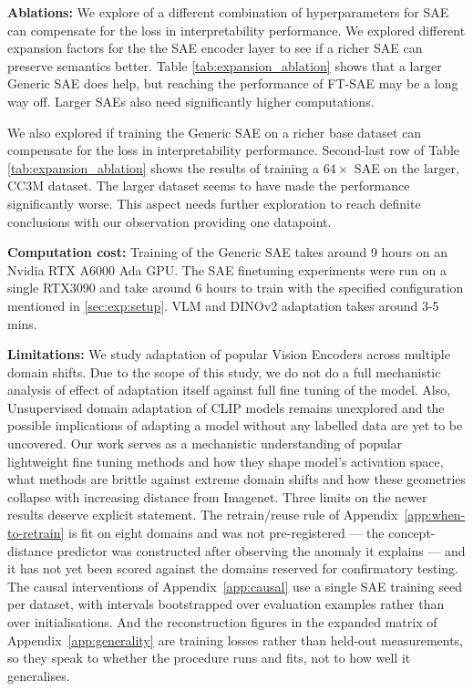 {\bf Ablations:}
We explore of a different combination of hyperparameters for SAE can compensate for the loss in interpretability performance. We explored different expansion factors for the the SAE encoder layer to see if a richer SAE can preserve semantics better. Table \ref{tab:expansion_ablation} shows that a larger Generic SAE does help, but reaching the performance of FT-SAE may be a long way off. Larger SAEs also need significantly higher computations.

We also explored if training the Generic SAE on a richer base dataset can compensate for the loss in interpretability performance. Second-last row of Table \ref{tab:expansion_ablation} shows the results of training a $64\times$ SAE on the larger, CC3M dataset. The larger dataset seems to have made the performance significantly worse. This aspect needs further exploration to reach definite conclusions with our observation providing one datapoint.

{\bf Computation cost:} Training of the Generic SAE takes around 9 hours on an Nvidia RTX A6000 Ada GPU. The SAE finetuning experiments were run on a single RTX3090  and take around 6 hours to train with the specified configuration mentioned in \ref{sec:exp:setup}. VLM and DINOv2 adaptation takes around 3-5 mins.

{\bf Limitations:}
We study adaptation of popular Vision Encoders across multiple domain shifts. Due to the scope of this study, we do not do a full mechanistic analysis of effect of adaptation itself against full fine tuning of the model. Also, Unsupervised domain adaptation of CLIP models remains unexplored and the possible implications of adapting a model without any labelled data are yet to be uncovered. Our work serves as a mechanistic understanding of popular lightweight fine tuning methods and how they shape model's activation space, what methods are brittle against extreme domain shifts and how these geometries collapse with increasing distance from Imagenet. Three limits on the newer results deserve explicit statement. The retrain/reuse rule of Appendix~\ref{app:when-to-retrain} is fit on eight domains and was not pre-registered --- the concept-distance predictor was constructed after observing the anomaly it explains --- and it has not yet been scored against the domains reserved for confirmatory testing. The causal interventions of Appendix~\ref{app:causal} use a single SAE training seed per dataset, with intervals bootstrapped over evaluation examples rather than over initialisations. And the reconstruction figures in the expanded matrix of Appendix~\ref{app:generality} are training losses rather than held-out measurements, so they speak to whether the procedure runs and fits, not to how well it generalises.